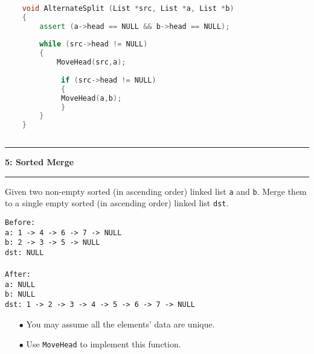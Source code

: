 \documentclass[10.5pt]{article}
\newcommand\question[2]{\vspace{.25in}\hrule\textbf{#1: #2}\vspace{.5em}\hrule\vspace{.10in}}
\begin{document}
    
    \hrulefill
    \begin{lstlisting}[language=C++]
    
    void AlternateSplit (List *src, List *a, List *b)
    {
        assert (a->head == NULL && b->head == NULL);
        
        while (src->head != NULL)
        {
            MoveHead(src,a);
    
             if (src->head != NULL)
             {
             MoveHead(a,b);
             }
        }
    }
    
    \end{lstlisting}
    \pagebreak
    
    
    \question{5}{Sorted Merge}
    Given two non-empty sorted (in ascending order) linked list \texttt{a} and \texttt{b}. Merge them to a single empty sorted (in ascending order) linked list \texttt{dst}.
    
    \texttt{Before:}\\
    \texttt{a: 1 -> 4 -> 6 -> 7 -> NULL}\\
    \texttt{b: 2 -> 3 -> 5 -> NULL}\\
    \texttt{dst: NULL}\\
    \\
    \texttt{After:}\\
    \texttt{a: NULL}\\
    \texttt{b: NULL}\\
    \texttt{dst: 1 -> 2 -> 3 -> 4 -> 5 -> 6 -> 7 -> NULL}\\
    
    \begin{enumerate}
        \item[$\bullet$] You may assume all the elements' data are unique.
        \item[$\bullet$] Use \texttt{MoveHead} to implement this function.
    \end{enumerate}
    \newpage
    
\end{document}
